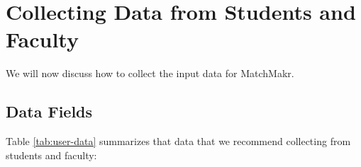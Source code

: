 \newcommand{\tabline}[4]{#1 & #2 & #3 & #4\\ \hline}
\newcommand{\tabheader}[4]{\hline \textbf{#1} & \textbf{#2} & \textbf{#3} & \textbf{#4}\\ \hline \hline}
\renewcommand{\arraystretch}{1.25}

\newcommand{\pbtwo}[1]{\parbox[t]{3in}{#1}}
\newcommand{\tabheadertwo}[2]{\hline \textbf{#1} & \textbf{#2} \\ \hline \hline}
\newcommand{\tablinetwo}[2]{\pbtwo{#1} & \pbtwo{#2} \\ \hline}



\newcommand{\cwidth}{1in}
\newcommand{\notrecommended}{\parbox[t]{\cwidth}{\centering{Not \\Recommended}}}
\newcommand{\pb}[1]{\parbox[t]{1.5in}{#1 \\}}
\newcommand{\olist}[1]{	$1^{st}$ #1 \\
						$2^{nd}$ #1 \\
						$3^{rd}$ #1 \\
						$\vdots$ \\
						$10^{th}$ #1 \\}
						



\chapter{Collecting Data from Students and Faculty}

We will now discuss how to collect the input data for MatchMakr.

\section{Data Fields}
Table \ref{tab:user-data} summarizes that data that we recommend collecting from students and faculty:


